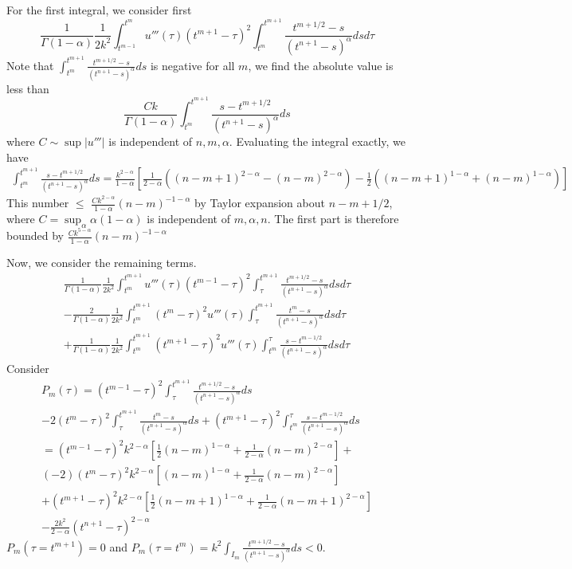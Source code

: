 \documentclass[11pt]{article}
\begin{document}
For the first integral, we consider first $$
\frac{1}{\Gamma(1-\alpha)}\frac{1}{2k^2}\int_{t^{m-1}}^{t^{m}}
u'''(\tau)(t^{m+1}-\tau)^2\int_{t^m}^{t^{m+1}}\frac{t^{m+1/2}-s}{(t^{n+1}-s)^{\alpha}}dsd\tau
$$
Note that $\int_{t^m}^{t^{m+1}}\frac{t^{m+1/2}-s}{(t^{n+1}-s)^{\alpha}}ds$
is negative for all $m$, we find the absolute value is less than $$
\frac{Ck}{\Gamma(1-\alpha)}\int_{t^m}^{t^{m+1}}\frac{s-t^{m+1/2}}{(t^{n+1}-s)^{\alpha}}ds
$$
where $C\sim \sup|u'''|$ is independent of $n,m,\alpha$.
Evaluating the integral exactly, we have
\begin{multline*}
\int_{t^m}^{t^{m+1}}\frac{s-t^{m+1/2}}{(t^{n+1}-s)^{\alpha}}ds
=\frac{k^{2-\alpha}}{1-\alpha}[
\frac{1}{2-\alpha}((n-m+1)^{2-\alpha}-(n-m)^{2-\alpha})
-\frac{1}{2}((n-m+1)^{1-\alpha}+(n-m)^{1-\alpha})]
\end{multline*}
This number $\le$ $\frac{Ck^{2-\alpha}}{1-\alpha}(n-m)^{-1-\alpha}$ by Taylor expansion about $n-m+1/2$, where $C=\sup_{\alpha}\alpha(1-\alpha)$ is independent of $m,\alpha, n$.
The first part is therefore bounded by $\frac{Ck^{5-\alpha}}{1-\alpha}(n-m)^{-1-\alpha}$

Now, we consider the remaining terms.
\begin{multline*}
\frac{1}{\Gamma(1-\alpha)}\frac{1}{2k^2}\int_{t^{m}}^{t^{m+1}}
u'''(\tau)(t^{m-1}-\tau)^2\int_{\tau}^{t^{m+1}}\frac{t^{m+1/2}-s}{(t^{n+1}-s)^{\alpha}}dsd\tau\\
-\frac{2}{\Gamma(1-\alpha)}\frac{1}{2k^2}\int_{t^m}^{t^{m+1}}
(t^m-\tau)^2u'''(\tau)\int_{\tau}^{t^{m+1}}\frac{t^{m}-s}{(t^{n+1}-s)^{\alpha}}dsd\tau\\
+\frac{1}{\Gamma(1-\alpha)}\frac{1}{2k^2}\int_{t^m}^{t^{m+1}}
(t^{m+1}-\tau)^2u'''(\tau)\int_{t^m}^{\tau}\frac{s-t^{m-1/2}}{(t^{n+1}-s)^{\alpha}}dsd\tau
\end{multline*}
Consider 
\begin{multline*}
P_m(\tau)=(t^{m-1}-\tau)^2\int_{\tau}^{t^{m+1}}\frac{t^{m+1/2}-s}{(t^{n+1}-s)^{\alpha}}ds\\
-2(t^m-\tau)^2\int_{\tau}^{t^{m+1}}\frac{t^{m}-s}{(t^{n+1}-s)^{\alpha}}ds
+(t^{m+1}-\tau)^2\int_{t^m}^{\tau}\frac{s-t^{m-1/2}}{(t^{n+1}-s)^{\alpha}}ds\\
=(t^{m-1}-\tau)^2k^{2-\alpha}[\frac{1}{2}(n-m)^{1-\alpha}+\frac{1}{2-\alpha}(n-m)^{2-\alpha}]+\\
(-2)(t^m-\tau)^2k^{2-\alpha}[(n-m)^{1-\alpha}+\frac{1}{2-\alpha}(n-m)^{2-\alpha}]\\
+(t^{m+1}-\tau)^2k^{2-\alpha}[\frac{1}{2}(n-m+1)^{1-\alpha}+\frac{1}{2-\alpha}(n-m+1)^{2-\alpha}]\\
-\frac{2k^2}{2-\alpha}(t^{n+1}-\tau)^{2-\alpha}
\end{multline*}
$P_m(\tau=t^{m+1})=0$ and
$P_m(\tau=t^m)=k^2\int_{I_m}\frac{t^{m+1/2}-s}{(t^{n+1}-s)^{\alpha}}ds<0$.
\end{document}
